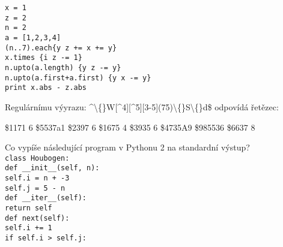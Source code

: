 \documentclass[addpoints,12pt]{exam}
\begin{document}
\begin{questions}
\texttt{x = 1\\
z = 2\\
n = 2\\
a = [1,2,3,4]\\
(n..7).each\{\textbar{}y\textbar{} z += x += y\}\\
x.times \{\textbar{}i\textbar{} z -= 1\}\\
n.upto(a.length) \{\textbar{}y\textbar{} z -= y\}\\
n.upto(a.first+a.first) \{\textbar{}y\textbar{} x -= y\}\\
print x.abs - z.abs}
\nopagebreak
\begin{choices}
\end{choices}
\question[2]
Regulárnímu výyrazu: \^{}\textbackslash\{\}W[\^{}4][\^{}5][3-5](7\textbar{}5)\textbackslash\{\}S\textbackslash\{\}d\${} odpovídá řetězec:
\nopagebreak
\begin{choices}
\choice
\${}1171 6
\choice
\${}5537a1
\choice
\${}2397 6
\choice
\${}1675 4
\choice
\${}3935 6
\choice
\${}4735A9
\choice
\${}985536
\choice
\${}6637 8
\end{choices}
\question[2]
Co vypíše následující program v Pythonu 2 na standardní výstup?\\
\texttt{class Houbogen:\\
\hspace*{0.6cm}def \_{}\_{}init\_{}\_{}(self, n):\\
\hspace*{0.6cm}\hspace*{0.6cm}self.i = n + -3\\
\hspace*{0.6cm}\hspace*{0.6cm}self.j = 5 - n\\
\hspace*{0.6cm}def \_{}\_{}iter\_{}\_{}(self):\\
\hspace*{0.6cm}\hspace*{0.6cm}return self\\
\hspace*{0.6cm}def next(self):\\
\hspace*{0.6cm}\hspace*{0.6cm}self.i += 1\\
\hspace*{0.6cm}\hspace*{0.6cm}if self.i \textgreater{} self.j:\\
}
\end{questions}
\end{document}
